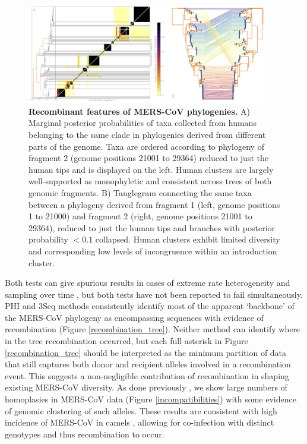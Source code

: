 \documentclass[9pt,lineno]{elife}
\begin{document}
\begin{figure}%
    \centering
    \includegraphics[width=0.95\textwidth]{figures/mers_recombinant_features.png}
    \caption{\textbf{Recombinant features of MERS-CoV phylogenies.}
    A) Marginal posterior probabilities of taxa collected from humans belonging to the same clade in phylogenies derived from different parts of the genome.
    Taxa are ordered according to phylogeny of fragment 2 (genome positions 21001 to 29364) reduced to just the human tips and is displayed on the left.
    Human clusters are largely well-supported as monophyletic and consistent across trees of both genomic fragments.
    B) Tanglegram connecting the same taxa between a phylogeny derived from fragment 1 (left, genome positions 1 to 21000) and fragment 2 (right, genome positions 21001 to 29364), reduced to just the human tips and branches with posterior probability $<0.1$ collapsed.
    Human clusters exhibit limited diversity and corresponding low levels of incongruence within an introduction cluster.
    }
    \label{recombinant_features}
\end{figure}

Both tests can give spurious results in cases of extreme rate heterogeneity and sampling over time \citep{dudas_mers-cov_2016}, but both tests have not been reported to fail simultaneously.
PHI and 3Seq methods consistently identify most of the apparent `backbone' of the MERS-CoV phylogeny as encompassing sequences with evidence of recombination (Figure \ref{recombination_tree}).
Neither method can identify where in the tree recombination occurred, but each full asterisk in Figure \ref{recombination_tree} should be interpreted as the minimum partition of data that still captures both donor and recipient alleles involved in a recombination event.
This suggests a non-negligible contribution of recombination in shaping existing MERS-CoV diversity.
As done previously \citep{dudas_mers-cov_2016}, we show large numbers of homoplasies in MERS-CoV data (Figure \ref{incompatibilities}) with some evidence of genomic clustering of such alleles.
These results are consistent with high incidence of MERS-CoV in camels \citep{muller_2014,corman_antibodies_2014,chu_2014,reusken_2014,ali_systematic_2017}, allowing for co-infection with distinct genotypes and thus recombination to occur.
\end{document}

